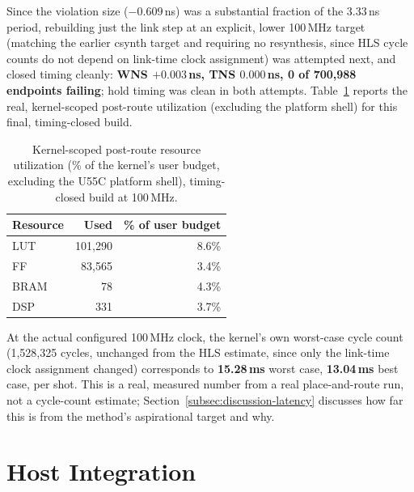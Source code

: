 \documentclass[conference]{IEEEtran}
\begin{document}
Since the violation size (\(-0.609\)\,ns) was a substantial fraction of the 3.33\,ns period, rebuilding just the link step at an explicit, lower 100\,MHz target (matching the earlier csynth target and requiring no resynthesis, since HLS cycle counts do not depend on link-time clock assignment) was attempted next, and closed timing cleanly: \textbf{WNS \(+0.003\)\,ns, TNS \(0.000\)\,ns, 0 of 700{,}988 endpoints failing}; hold timing was clean in both attempts. Table~\ref{tab:kernel-util-routed} reports the real, kernel-scoped post-route utilization (excluding the platform shell) for this final, timing-closed build.

\begin{table}[t]
\centering
\caption{Kernel-scoped post-route resource utilization (\% of the kernel's user budget, excluding the U55C platform shell), timing-closed build at 100\,MHz.}
\label{tab:kernel-util-routed}
\begin{tabular}{lrr}
\toprule
Resource & Used & \% of user budget \\
\midrule
LUT & 101{,}290 & 8.6\% \\
FF & 83{,}565 & 3.4\% \\
BRAM & 78 & 4.3\% \\
DSP & 331 & 3.7\% \\
\bottomrule
\end{tabular}
\end{table}

At the actual configured 100\,MHz clock, the kernel's own worst-case cycle count (1{,}528{,}325 cycles, unchanged from the HLS estimate, since only the link-time clock assignment changed) corresponds to \textbf{15.28\,ms} worst case, \textbf{13.04\,ms} best case, per shot. This is a real, measured number from a real place-and-route run, not a cycle-count estimate; Section~\ref{subsec:discussion-latency} discusses how far this is from the method's aspirational target and why.

\section{Host Integration}
\label{sec:host-section}
\end{document}
